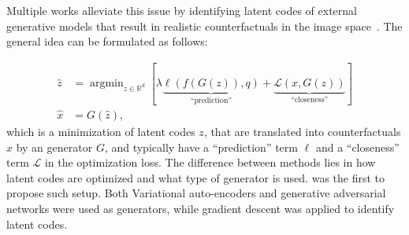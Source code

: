 \documentclass[11pt,a4paper,twoside,openright,final]{memoir}
\makeatletter
\DeclareMathOperator*{\argmin}{\arg\min}
\def\ifdraft{\ifdim\overfullrule>\z@
  \expandafter\@firstoftwo\else\expandafter\@secondoftwo\fi}
\newcommand{\content}[1]{{
    \ifdraft{
        \textcolor{pink}{
            \textbf{\\$\blacktriangleright$} #1\textbf{$\blacktriangleleft$}\\}
    }{}}}
\makeatother
\begin{document}

 
Multiple works alleviate this issue by identifying latent codes of external generative models that result in realistic counterfactuals in the image space~\cite{Joshi2018, Rodriguez2021, Singla2019, flowcounterfactuals}.
The general idea can be formulated as follows: 

\begin{align}\label{eq:generator-cf}
    \hat z &= \argmin_{z\in \mathbb{R}^d} [ 
        \lambda   \underbrace{\ell(f(G(z)) , q)}_{\text{``prediction''}}
        +            \underbrace{\mathcal{L}(x , G(z))}_{\text{``closeness''}}]\\
    \hat x &= G(\hat z),
\end{align} 
which is a minimization of latent codes $z$, that are translated into counterfactuals $\hat x$ by an generator $G$, and typically have a ``prediction'' term $\ell$ and a ``closeness'' term $\mathcal{L}$ in the optimization loss.
The difference between methods lies in how latent codes are optimized and what type of generator is used. 
\cite{Joshi2018} was the first to propose such setup.
Both Variational auto-encoders and generative adversarial networks were used as generators, while gradient descent was applied to identify latent codes. 
\end{document}
